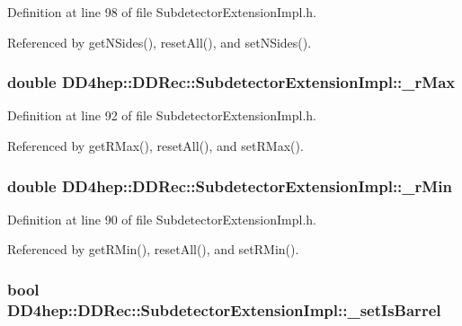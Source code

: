 Definition at line 98 of file SubdetectorExtensionImpl.h.

Referenced by getNSides(), resetAll(), and setNSides().\hypertarget{class_d_d4hep_1_1_d_d_rec_1_1_subdetector_extension_impl_ac9a17365ea087ce3a3b9dbec6b514f14}{
\subsubsection[{\_\-rMax}]{\setlength{\rightskip}{0pt plus 5cm}double {\bf DD4hep::DDRec::SubdetectorExtensionImpl::\_\-rMax}}}
\label{class_d_d4hep_1_1_d_d_rec_1_1_subdetector_extension_impl_ac9a17365ea087ce3a3b9dbec6b514f14}


Definition at line 92 of file SubdetectorExtensionImpl.h.

Referenced by getRMax(), resetAll(), and setRMax().\hypertarget{class_d_d4hep_1_1_d_d_rec_1_1_subdetector_extension_impl_a01b803bfceeeff565ed7728e6292ecb6}{
\subsubsection[{\_\-rMin}]{\setlength{\rightskip}{0pt plus 5cm}double {\bf DD4hep::DDRec::SubdetectorExtensionImpl::\_\-rMin}}}
\label{class_d_d4hep_1_1_d_d_rec_1_1_subdetector_extension_impl_a01b803bfceeeff565ed7728e6292ecb6}


Definition at line 90 of file SubdetectorExtensionImpl.h.

Referenced by getRMin(), resetAll(), and setRMin().\hypertarget{class_d_d4hep_1_1_d_d_rec_1_1_subdetector_extension_impl_a5044a5f0bffb6967aa75c1486d7e0403}{
\subsubsection[{\_\-setIsBarrel}]{\setlength{\rightskip}{0pt plus 5cm}bool {\bf DD4hep::DDRec::SubdetectorExtensionImpl::\_\-setIsBarrel}}}
\label{class_d_d4hep_1_1_d_d_rec_1_1_subdetector_extension_impl_a5044a5f0bffb6967aa75c1486d7e0403}


